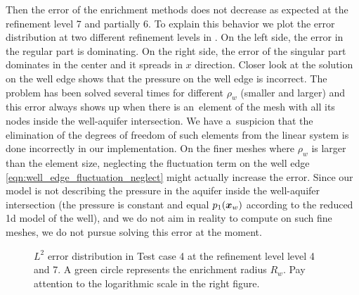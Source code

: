Then the error of the enrichment methods does not decrease as expected at the refinement level 7 and partially 6. 
To explain this behavior we plot the error distribution at two different refinement levels in .
On the left side, the error in the regular part is dominating. On the right side, the error of the singular part dominates in the center
and it spreads in $x$ direction. Closer look at the solution on the well edge shows that the pressure on the well edge is incorrect.
The problem has been solved several times for different $\rho_w$ (smaller and larger) and this error always shows up when there is 
an~element of the mesh with all its nodes inside the well-aquifer intersection.
We have a~suspicion that the elimination of the degrees of freedom of such elements from the linear system is done incorrectly
in our implementation. On the finer meshes where $\rho_w$ is larger than the element size,
neglecting the fluctuation term on the well edge \eqref{eqn:well_edge_fluctuation_neglect} might actually increase the error.
Since our model is not describing the pressure in the aquifer inside the well-aquifer intersection
(the pressure is constant and equal $p_1(\mathbf{\boldsymbol{x}}_w)$ according to the reduced 1d model of the well),
and we do not aim in reality to compute on such fine meshes, we do not pursue solving this error at the moment.

\begin{figure}[!htb]
  \centering
  \hfill
  \caption[Error distribution in Test case 4.]{$L^2$ error distribution in Test case 4 at the refinement level level 4 and 7.
  A green circle represents the enrichment radius $R_w$. Pay attention to the logarithmic scale in the right figure.}
  \label{fig:error_distribution_test4}
\end{figure}
%

